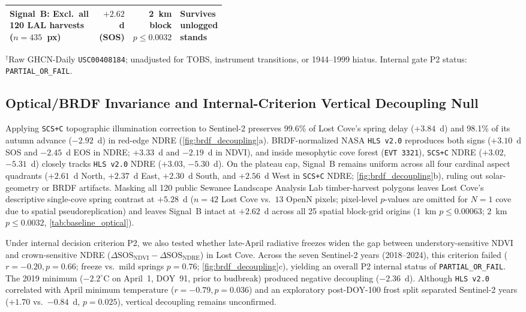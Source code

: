 \begin{table}[t]
\begin{threeparttable}
\begin{tabularx}{\linewidth}{@{} >{\raggedright\arraybackslash}p{0.42\linewidth} r r >{\raggedright\arraybackslash}X @{}}
Signal~B: Excl.\ all 120 LAL harvests ($n=435$~px) & $+2.62$~d (SOS) & 2~km block $p \le 0.0032$ & Survives unlogged stands \\
\bottomrule
\end{tabularx}
\begin{tablenotes}[flushleft]
\footnotesize
\item $^\dagger$Raw GHCN-Daily \texttt{USC00408184}; unadjusted for TOBS, instrument transitions, or 1944--1999 hiatus. Internal gate P2 status: \texttt{PARTIAL\_OR\_FAIL}.
\end{tablenotes}
\end{threeparttable}
\end{table}

\subsection{Optical/BRDF Invariance and Internal-Criterion Vertical Decoupling Null}
Applying \texttt{SCS+C} topographic illumination correction to Sentinel-2 preserves 99.6\% of Lost Cove's spring delay ($+3.84$~d) and 98.1\% of its autumn advance ($-2.92$~d) in red-edge NDRE (\cref{fig:brdf_decoupling}a). BRDF-normalized NASA \texttt{HLS v2.0} reproduces both signs ($+3.10$~d SOS and $-2.45$~d EOS in NDRE; $+3.33$~d and $-2.19$~d in NDVI), and inside mesophytic cove forest (\texttt{EVT 3321}), \texttt{SCS+C} NDRE ($+3.02$, $-5.31$~d) closely tracks \texttt{HLS v2.0} NDRE ($+3.03$, $-5.30$~d). On the plateau cap, Signal~B remains uniform across all four cardinal aspect quadrants ($+2.61$~d North, $+2.37$~d East, $+2.30$~d South, and $+2.56$~d West in \texttt{SCS+C} NDRE; \cref{fig:brdf_decoupling}b), ruling out solar-geometry or BRDF artifacts. Masking all 120 public Sewanee Landscape Analysis Lab timber-harvest polygons leaves Lost Cove's descriptive single-cove spring contrast at $+5.28$~d ($n=42$ Lost Cove vs.\ $13$ OpenN pixels; pixel-level $p$-values are omitted for $N=1$ cove due to spatial pseudoreplication) and leaves Signal~B intact at $+2.62$~d across all 25 spatial block-grid origins ($1$~km $p \le 0.00063$; $2$~km $p \le 0.0032$, \cref{tab:baseline_optical}).

Under internal decision criterion P2, we also tested whether late-April radiative freezes widen the gap between understory-sensitive NDVI and crown-sensitive NDRE ($\Delta\text{SOS}_{\text{NDVI}} - \Delta\text{SOS}_{\text{NDRE}}$) in Lost Cove. Across the seven Sentinel-2 years (2018--2024), this criterion failed ($r=-0.20, p=0.66$; freeze vs.\ mild springs $p=0.76$; \cref{fig:brdf_decoupling}c), yielding an overall P2 internal status of \texttt{PARTIAL\_OR\_FAIL}. The 2019 minimum ($-2.2^\circ$C on April~1, DOY~91, prior to budbreak) produced negative decoupling ($-2.36$~d). Although \texttt{HLS v2.0} correlated with April minimum temperature ($r=-0.79, p=0.036$) and an exploratory post-DOY-100 frost split separated Sentinel-2 years ($+1.70$ vs.\ $-0.84$~d, $p=0.025$), vertical decoupling remains unconfirmed.

